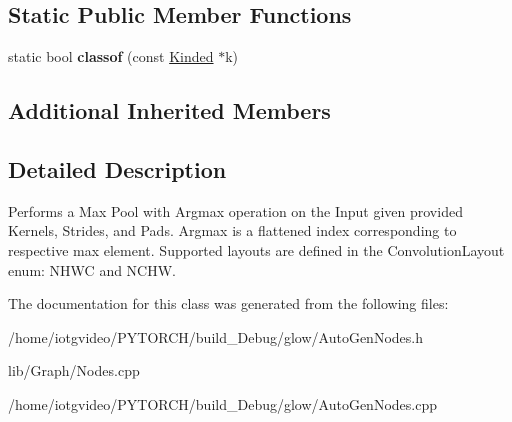 \subsection*{Static Public Member Functions}
\begin{DoxyCompactItemize}
\item 
\mbox{\label{classglow_1_1_max_pool_node_a31cc60d3b4aa5149cb0d791b7149de9b}} 
static bool {\bfseries classof} (const \hyperlink{classglow_1_1_kinded}{Kinded} $\ast$k)
\end{DoxyCompactItemize}
\subsection*{Additional Inherited Members}


\subsection{Detailed Description}
Performs a Max Pool with Argmax operation on the Input given provided Kernels, Strides, and Pads. Argmax is a flattened index corresponding to respective max element. Supported layouts are defined in the Convolution\+Layout enum\+: N\+H\+WC and N\+C\+HW. 

The documentation for this class was generated from the following files\+:\begin{DoxyCompactItemize}
\item 
/home/iotgvideo/\+P\+Y\+T\+O\+R\+C\+H/build\+\_\+\+Debug/glow/Auto\+Gen\+Nodes.\+h\item 
lib/\+Graph/Nodes.\+cpp\item 
/home/iotgvideo/\+P\+Y\+T\+O\+R\+C\+H/build\+\_\+\+Debug/glow/Auto\+Gen\+Nodes.\+cpp\end{DoxyCompactItemize}
